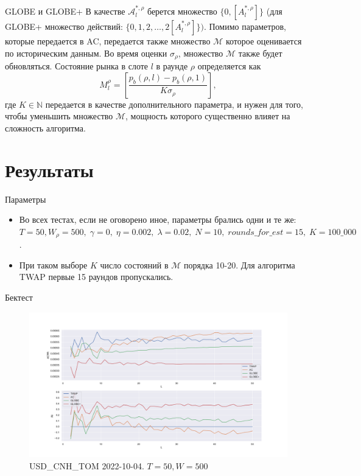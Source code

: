 \documentclass[aspectratio=169]{beamer}
\begin{document}
        \begin{frame}{GLOBE и GLOBE+}
            В качестве $\mathcal A_l^{*, \rho}$ берется множество $\{0, [A_l^{*,\rho}]\}$ (для GLOBE+ множество действий: $\{0, 1, 2, \ldots, 2 [A_l^{*,\rho}] \} )$. Помимо параметров, которые передается в AC, передается также множество $\mathcal M$ которое оценивается по историческим данным. Во время оценки $\sigma_\rho$, множество $\mathcal M$ также будет обновляться. 
            Состояние рынка в слоте $l$ в раунде $\rho$ определяется как 
            \begin{equation*}
                M_l^\rho = \left[\frac {p_b(\rho, l) - p_b(\rho, 1)}{K\sigma_\rho} \right],
            \end{equation*}
            где $K \in \mathbb N$ передается в качестве дополнительного параметра, и нужен для того, чтобы уменьшить множество $\mathcal M$, мощность которого существенно влияет на сложность алгоритма.

        \end{frame}


    \section{Результаты}

        \begin{frame}{Параметры}
            \begin{itemize}
                \item Во всех тестах, если не оговорено иное, параметры брались одни и те же: $T = 50, W_\rho = 500, \; \gamma = 0, \; \eta = 0.002, \; \lambda = 0.02, \; N = 10, \; rounds\_for\_est = 15, \; K = 100\_000$. 

                \item При таком выборе $K$ число состояний в $\mathcal M$ порядка 10-20. Для алгоритма TWAP первые 15 раундов пропускались. 
            \end{itemize}  
        \end{frame}
        
        \begin{frame}{Бектест}
        
            \begin{figure}  
                \centering
                \includegraphics[width=0.83\linewidth]{USD_CNH_T+1 2022-10-04 T = 50 W = 500}
                \caption{USD\_CNH\_TOM 2022-10-04. $T = 50, W = 500$}
            \end{figure}

        \end{frame}
\end{document}
